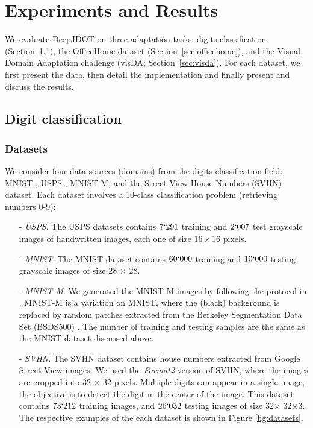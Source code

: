 \documentclass[runningheads]{llncs}
\begin{document}
\section{Experiments and Results}

We evaluate DeepJDOT on three adaptation tasks: digits classification (Section~\ref{sec:data}), the OfficeHome dataset (Section~\ref{sec:officehome}), and the Visual Domain Adaptation challenge (visDA; Section~\ref{sec:visda}). For each dataset, we first present the data, then detail the implementation and finally present and discuss the results.



\subsection{Digit classification}\label{sec:data}

\subsubsection*{Datasets} We consider four data sources (domains) from the digits classification field: MNIST \cite{Lecun98}, USPS \cite{Hull94}, MNIST-M, and the Street View House Numbers (SVHN) \cite{Netzer11} dataset. Each dataset involves a 10-class classification problem (retrieving numbers 0-9):

\begin{itemize}
\item[-] \emph{USPS}. The USPS datasets contains $7`291$ training and $2`007$ test grayscale images of handwritten images, each one of size $16 \times16$ pixels.
\item[-] \emph{MNIST}. The MNIST dataset contains $60`000$ training and $10`000$ testing grayscale images of size 28 $\times$ 28.
\item[-] \emph{MNIST M}. We generated the MNIST-M images by following the protocol in \cite{Ganin2016}. MNIST-M is a variation on MNIST, where the (black) background is replaced by random patches extracted from the Berkeley Segmentation Data Set (BSDS500) \cite{Arbelaez11}. The number of training and testing samples are the same as the MNIST dataset discussed above.
\item[-] \emph{SVHN}. The SVHN dataset contains house numbers extracted from Google Street View images. We used the \textit{Format2} version of SVHN, where the images are cropped into 32 $\times$ 32 pixels. Multiple digits can appear in a single image, the objective is to detect the digit in the center of the image. This dataset contains $73`212$ training images, and $26`032$ testing images of size 32$\times$ 32$\times$3. The respective examples of the each dataset is shown in Figure \ref{fig:datasets}.
\end{itemize}
\end{document}
